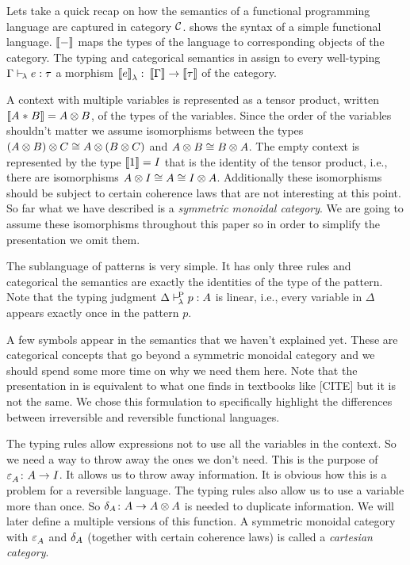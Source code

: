 \documentclass[runningheads,envcountsame]{llncs}
\begin{document}
    Lets take a quick recap on how the semantics of a functional programming language are captured in category $\mathcal{C}$.  shows the syntax of a simple functional language. $\sem{-}$ maps the types of the language to corresponding objects of the category. The typing and categorical semantics in  assign to every well-typing $\Gamma \vdash_{\!\lambda} e : \tau$ a morphism $\semL{e}\colon \sem{\Gamma} \to \sem{\tau}$ of the category.
    
    A context with multiple variables is represented as a tensor product, written $\sem{\tpair{A}{B}} = \tensor{A}{B}$, of the types of the variables. Since the order of the variables shouldn't matter we assume isomorphisms between the types $\tensor{(\tensor{A}{B})}{C} \cong \tensor{A}{(\tensor{B}{C})}$ and $\tensor{A}{B} \cong \tensor{B}{A}$. The empty context is represented by the type $\sem{\tunit} = I$ that is the identity of the tensor product, i.e., there are isomorphisms $\tensor{A}{I} \cong A \cong \tensor{I}{A}$. Additionally these isomorphisms should be subject to certain coherence laws that are not interesting at this point. So far what we have described is a \emph{symmetric monoidal category}. We are going to assume these isomorphisms throughout this paper so in order to simplify the presentation we omit them.
    
    The sublanguage of patterns is very simple. It has only three rules and categorical the semantics are exactly the identities of the type of the pattern. Note that the typing judgment $\Delta \vdash^{\!\mathrm{P}}_{\!\lambda} p : A$ is linear, i.e., every variable in $\Delta$ appears exactly once in the pattern $p$.
    
    A few symbols appear in the semantics that we haven't explained yet. These are categorical concepts that go beyond a symmetric monoidal category and we should spend some more time on why we need them here. Note that the presentation in  is equivalent to what one finds in textbooks like [CITE] but it is not the same. We chose this formulation to specifically highlight the differences between irreversible and reversible functional languages.
    
    The typing rules allow expressions not to use all the variables in the context. So we need a way to throw away the ones we don't need. This is the purpose of ${\varepsilon}^{}_A\colon A \to I$. It allows us to throw away information. It is obvious how this is a problem for a reversible language. The typing rules also allow us to use a variable more than once. So $\dup_A\colon A \to \tensor{A}{A}$ is needed to duplicate information. We will later define a multiple versions of this function. A symmetric monoidal category with ${\varepsilon}^{}_A$ and $\dup_A$ (together with certain coherence laws) is called a \emph{cartesian category}.
    
\end{document}
